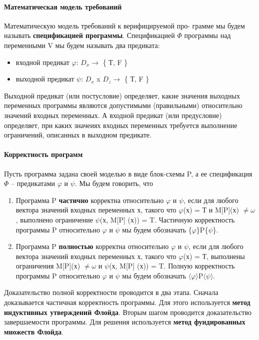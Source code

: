 \paragraph{Математическая модель требований}
Математическую модель требований к верифицируемой про- грамме мы будем называть \textbf{спецификацией программы}. Спецификацией $\Phi$ программы над переменными V мы будем называть два предиката:
\begin{itemize}
    \item входной предикат $\varphi$: $D_x \rightarrow$ \{ Т, F \}
    \item выходной предикат $\psi$: $D_x$ x $D_z \rightarrow$ \{ Т, F \}
\end{itemize}
Выходной предикат (или постусловие) определяет, какие значения выходных переменных программы являются допустимыми (правильными) относительно значений входных переменных. А входной предикат (или предусловие) определяет, при каких значеиях входных переменных требуется выполнение ограничений, описанных в выходном предикате.
\paragraph{Корректность программ}
Пусть программа задана своей моделью в виде блок-схемы P, а ее спецификация $\Phi$ – предикатами $\varphi$ и $\psi$. Мы будем говорить, что
\begin{enumerate}
    \item Программа P \textbf{частично} корректна относительно $\varphi$ и $\psi$, если для любого вектора значений входных переменных х, такого что  $\varphi$(х) = Т и M[P](х) $\neq \omega$, выполнено ограничение $\psi$(х, M[P] (х)) = T. Частичную корректность программы P относительно $\varphi$ и $\psi$ мы будем обозначать \{$\varphi$\}P\{$\psi$\}.
    \item Программа P \textbf{полностью} корректна относительно $\varphi$ и $\psi$, если для любого вектора значений входных переменных х, такого что $\varphi$(х) = Т, выполнены ограничения M[P](х) $\neq \omega$ и $\psi$(х, M[P] (х)) = T. Полную корректность программы P относительно $\varphi$ и $\psi$ мы будем обозначать $\langle\varphi\rangle$P$\langle\psi\rangle$.

\end{enumerate}

Доказательство полной корректности проводится в два этапа. Сначала доказывается частичная корректность программы. Для этого используется \textbf{метод индуктивных утверждений Флойда}. Вторым шагом проводится доказательство завершаемости программы. Для решения используется \textbf{метод фундированных множеств Флойда}.

